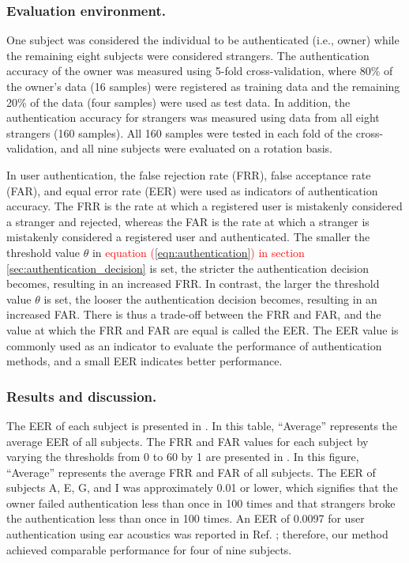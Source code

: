 \documentclass[english,preprint,JIP]{ipsj}
\begin{document}
\subsubsection{Evaluation environment.}
One subject was considered the individual to be authenticated (i.e., owner) while the remaining eight subjects were considered strangers. The authentication accuracy of the owner was measured using 5-fold cross-validation, where 80\% of the owner's data (16 samples) were registered as training data and the remaining 20\% of the data (four samples) were used as test data. In addition, the authentication accuracy for strangers was measured using data from all eight strangers (160 samples). All 160 samples were tested in each fold of the cross-validation, and all nine subjects were evaluated on a rotation basis.\par

In user authentication, the false rejection rate (FRR), false acceptance rate (FAR), and equal error rate (EER) were used as indicators of authentication accuracy. The FRR is the rate at which a registered user is mistakenly considered a stranger and rejected, whereas the FAR is the rate at which a stranger is mistakenly considered a registered user and authenticated. The smaller the threshold value $\theta$ in \textcolor{red}{equation (\ref{eqn:authentication}) in section \ref{sec:authentication_decision}} is set, the stricter the authentication decision becomes, resulting in an increased FRR. In contrast, the larger the threshold value $\theta$ is set, the looser the authentication decision becomes, resulting in an increased FAR. There is thus a trade-off between the FRR and FAR, and the value at which the FRR and FAR are equal is called the EER. The EER value is commonly used as an indicator to evaluate the performance of authentication methods, and a small EER indicates better performance.


\subsubsection{Results and discussion.}
The EER of each subject is presented in . In this table, ``Average'' represents the average EER of all subjects. The FRR and FAR values for each subject by varying the thresholds from 0 to 60 by 1 are presented in . In this figure, ``Average'' represents the average FRR and FAR of all subjects. The EER of subjects A, E, G, and I was approximately 0.01 or lower, which signifies that the owner failed authentication less than once in 100 times and that strangers broke the authentication less than once in 100 times. An EER of 0.0097 for user authentication using ear acoustics was reported in Ref. \cite{ear_auth}; therefore, our method achieved comparable performance for four of nine subjects.\par
\end{document}
